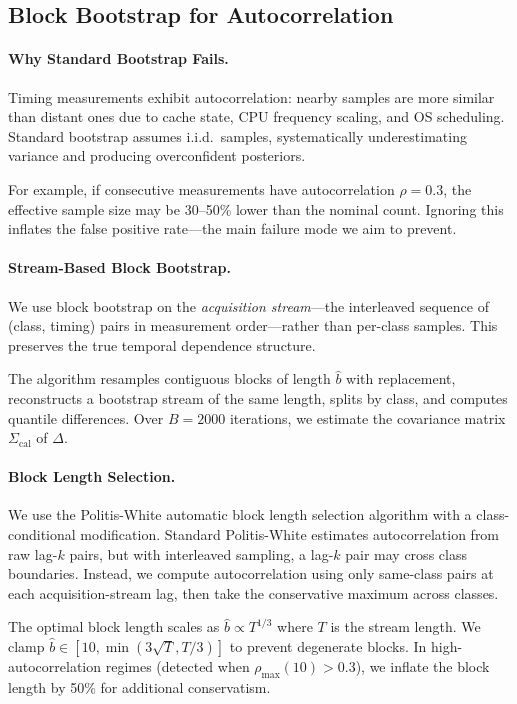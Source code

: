 \subsection{Block Bootstrap for Autocorrelation}
\label{app:bootstrap}

\paragraph{Why Standard Bootstrap Fails.}
Timing measurements exhibit autocorrelation: nearby samples are more similar than distant ones due to cache state, CPU frequency scaling, and OS scheduling. Standard bootstrap assumes i.i.d.\ samples, systematically underestimating variance and producing overconfident posteriors.

For example, if consecutive measurements have autocorrelation $\rho = 0.3$, the effective sample size may be 30--50\% lower than the nominal count. Ignoring this inflates the false positive rate---the main failure mode we aim to prevent.

\paragraph{Stream-Based Block Bootstrap.}
We use block bootstrap on the \emph{acquisition stream}---the interleaved sequence of (class, timing) pairs in measurement order---rather than per-class samples. This preserves the true temporal dependence structure.

The algorithm resamples contiguous blocks of length $\hat{b}$ with replacement, reconstructs a bootstrap stream of the same length, splits by class, and computes quantile differences. Over $B = 2000$ iterations, we estimate the covariance matrix $\Sigma_{\text{cal}}$ of $\Delta$.

\paragraph{Block Length Selection.}
We use the Politis-White automatic block length selection algorithm with a class-conditional modification. Standard Politis-White estimates autocorrelation from raw lag-$k$ pairs, but with interleaved sampling, a lag-$k$ pair may cross class boundaries. Instead, we compute autocorrelation using only same-class pairs at each acquisition-stream lag, then take the conservative maximum across classes.

The optimal block length scales as $\hat{b} \propto T^{1/3}$ where $T$ is the stream length. We clamp $\hat{b} \in [10, \min(3\sqrt{T}, T/3)]$ to prevent degenerate blocks. In high-autocorrelation regimes (detected when $\rho_{\text{max}}(10) > 0.3$), we inflate the block length by 50\% for additional conservatism.

